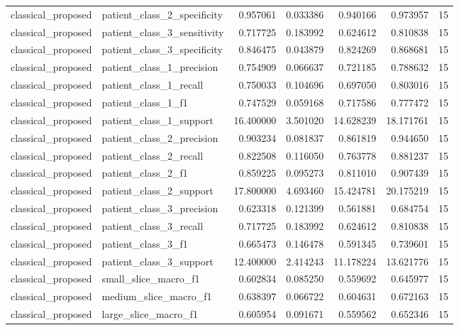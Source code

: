 \begin{tabular}{llrrrrr}
classical_proposed & patient_class_2_specificity & 0.957061 & 0.033386 & 0.940166 & 0.973957 & 15 \\
classical_proposed & patient_class_3_sensitivity & 0.717725 & 0.183992 & 0.624612 & 0.810838 & 15 \\
classical_proposed & patient_class_3_specificity & 0.846475 & 0.043879 & 0.824269 & 0.868681 & 15 \\
classical_proposed & patient_class_1_precision & 0.754909 & 0.066637 & 0.721185 & 0.788632 & 15 \\
classical_proposed & patient_class_1_recall & 0.750033 & 0.104696 & 0.697050 & 0.803016 & 15 \\
classical_proposed & patient_class_1_f1 & 0.747529 & 0.059168 & 0.717586 & 0.777472 & 15 \\
classical_proposed & patient_class_1_support & 16.400000 & 3.501020 & 14.628239 & 18.171761 & 15 \\
classical_proposed & patient_class_2_precision & 0.903234 & 0.081837 & 0.861819 & 0.944650 & 15 \\
classical_proposed & patient_class_2_recall & 0.822508 & 0.116050 & 0.763778 & 0.881237 & 15 \\
classical_proposed & patient_class_2_f1 & 0.859225 & 0.095273 & 0.811010 & 0.907439 & 15 \\
classical_proposed & patient_class_2_support & 17.800000 & 4.693460 & 15.424781 & 20.175219 & 15 \\
classical_proposed & patient_class_3_precision & 0.623318 & 0.121399 & 0.561881 & 0.684754 & 15 \\
classical_proposed & patient_class_3_recall & 0.717725 & 0.183992 & 0.624612 & 0.810838 & 15 \\
classical_proposed & patient_class_3_f1 & 0.665473 & 0.146478 & 0.591345 & 0.739601 & 15 \\
classical_proposed & patient_class_3_support & 12.400000 & 2.414243 & 11.178224 & 13.621776 & 15 \\
classical_proposed & small_slice_macro_f1 & 0.602834 & 0.085250 & 0.559692 & 0.645977 & 15 \\
classical_proposed & medium_slice_macro_f1 & 0.638397 & 0.066722 & 0.604631 & 0.672163 & 15 \\
classical_proposed & large_slice_macro_f1 & 0.605954 & 0.091671 & 0.559562 & 0.652346 & 15 \\
\bottomrule
\end{tabular}
